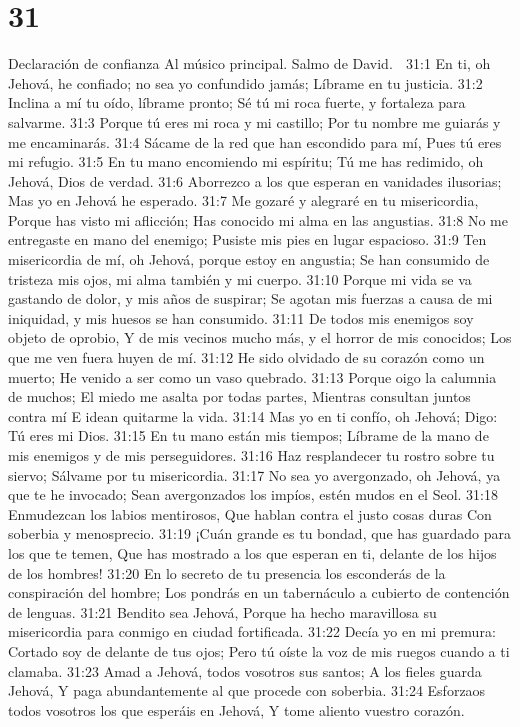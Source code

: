 \chapter{31}

Declaración de confianza 
Al músico principal. Salmo de David. 

31:1 En ti, oh Jehová, he confiado; no sea yo confundido jamás; 
Líbrame en tu justicia. 
31:2 Inclina a mí tu oído, líbrame pronto; 
Sé tú mi roca fuerte, y fortaleza para salvarme. 
31:3 Porque tú eres mi roca y mi castillo; 
Por tu nombre me guiarás y me encaminarás. 
31:4 Sácame de la red que han escondido para mí, 
Pues tú eres mi refugio. 
31:5 En tu mano encomiendo mi espíritu;  
Tú me has redimido, oh Jehová, Dios de verdad. 
31:6 Aborrezco a los que esperan en vanidades ilusorias; 
Mas yo en Jehová he esperado. 
31:7 Me gozaré y alegraré en tu misericordia, 
Porque has visto mi aflicción; 
Has conocido mi alma en las angustias. 
31:8 No me entregaste en mano del enemigo; 
Pusiste mis pies en lugar espacioso. 
31:9 Ten misericordia de mí, oh Jehová, porque estoy en angustia; 
Se han consumido de tristeza mis ojos, mi alma también y mi cuerpo. 
31:10 Porque mi vida se va gastando de dolor, y mis años de suspirar; 
Se agotan mis fuerzas a causa de mi iniquidad, y mis huesos se han consumido. 
31:11 De todos mis enemigos soy objeto de oprobio, 
Y de mis vecinos mucho más, y el horror de mis conocidos; 
Los que me ven fuera huyen de mí. 
31:12 He sido olvidado de su corazón como un muerto; 
He venido a ser como un vaso quebrado. 
31:13 Porque oigo la calumnia de muchos; 
El miedo me asalta por todas partes, 
Mientras consultan juntos contra mí 
E idean quitarme la vida. 
31:14 Mas yo en ti confío, oh Jehová; 
Digo: Tú eres mi Dios. 
31:15 En tu mano están mis tiempos; 
Líbrame de la mano de mis enemigos y de mis perseguidores. 
31:16 Haz resplandecer tu rostro sobre tu siervo; 
Sálvame por tu misericordia. 
31:17 No sea yo avergonzado, oh Jehová, ya que te he invocado; 
Sean avergonzados los impíos, estén mudos en el Seol. 
31:18 Enmudezcan los labios mentirosos, 
Que hablan contra el justo cosas duras 
Con soberbia y menosprecio. 
31:19 ¡Cuán grande es tu bondad, que has guardado para los que te temen, 
Que has mostrado a los que esperan en ti, delante de los hijos de los hombres! 
31:20 En lo secreto de tu presencia los esconderás de la conspiración del hombre; 
Los pondrás en un tabernáculo a cubierto de contención de lenguas. 
31:21 Bendito sea Jehová, 
Porque ha hecho maravillosa su misericordia para conmigo en ciudad fortificada. 
31:22 Decía yo en mi premura: Cortado soy de delante de tus ojos; 
Pero tú oíste la voz de mis ruegos cuando a ti clamaba. 
31:23 Amad a Jehová, todos vosotros sus santos; 
A los fieles guarda Jehová, 
Y paga abundantemente al que procede con soberbia. 
31:24 Esforzaos todos vosotros los que esperáis en Jehová, 
Y tome aliento vuestro corazón. 

